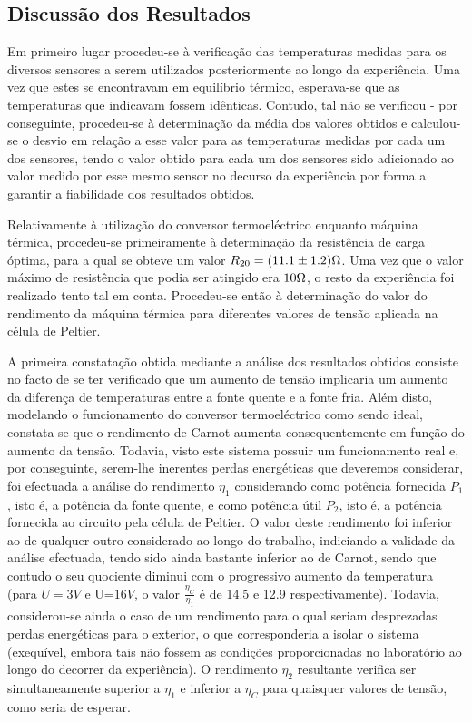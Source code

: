 \documentclass[9pt]{extarticle}
\begin{document}
\begin{multicols}{2}
\section{Discussão dos Resultados}

\par Em primeiro lugar procedeu-se à verificação das temperaturas medidas para os diversos sensores a serem utilizados posteriormente ao longo da experiência. Uma vez que estes se encontravam em equilíbrio térmico, esperava-se que as temperaturas que indicavam fossem idênticas. Contudo, tal não se verificou - por conseguinte, procedeu-se à determinação da média dos valores obtidos e calculou-se o desvio em relação a esse valor para as temperaturas medidas por cada um dos sensores, tendo o valor obtido para cada um dos sensores sido adicionado ao valor medido por esse mesmo sensor no decurso da experiência por forma a garantir a fiabilidade dos resultados obtidos.

\par Relativamente à utilização do conversor termoeléctrico enquanto máquina térmica, procedeu-se primeiramente à determinação da resistência de carga óptima, para a qual se obteve um valor $R_{20}=(11.1\pm1.2)\ohm$. Uma vez que o valor máximo de resistência que podia ser atingido era $10\ohm$, o resto da experiência foi realizado tento tal em conta. Procedeu-se então à determinação do valor do rendimento da máquina térmica para diferentes valores de tensão aplicada na célula de Peltier.

\par A primeira constatação obtida mediante a análise dos resultados obtidos consiste no facto de se ter verificado que um aumento de tensão implicaria um aumento da diferença de temperaturas entre a fonte quente e a fonte fria. Além disto, modelando o funcionamento do conversor termoeléctrico como sendo ideal, constata-se que o rendimento de Carnot aumenta consequentemente em função do aumento da tensão. Todavia, visto este sistema possuir um funcionamento real e, por conseguinte, serem-lhe inerentes perdas energéticas que deveremos considerar, foi efectuada a análise do rendimento $\eta_1$ considerando como potência fornecida $P_1$, isto é, a potência da fonte quente, e como potência útil $P_2$, isto é, a potência fornecida ao circuito pela célula de Peltier. O valor deste rendimento foi inferior ao de qualquer outro considerado ao longo do trabalho, indiciando a validade da análise efectuada, tendo sido ainda bastante inferior ao de Carnot, sendo que contudo o seu quociente diminui com o progressivo aumento da temperatura (para $U=3V$ e U=$16V$, o valor $\frac{\eta_C}{\eta_1}$ é de 14.5 e 12.9 respectivamente). Todavia, considerou-se ainda o caso de um rendimento para o qual seriam desprezadas perdas energéticas para o exterior, o que corresponderia a isolar o sistema (exequível, embora tais não fossem as condições proporcionadas no laboratório ao longo do decorrer da experiência). O rendimento $\eta_2$ resultante verifica ser simultaneamente superior a $\eta_1$ e inferior a $\eta_C$ para quaisquer valores de tensão, como seria de esperar.


\end{multicols}
\end{document}
